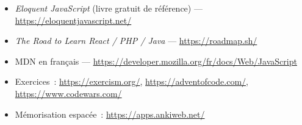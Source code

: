 \begin{ressources}
\begin{itemize}
  \item \emph{Eloquent JavaScript} (livre gratuit de r\'ef\'erence) --- \url{https://eloquentjavascript.net/}
  \item \emph{The Road to Learn React / PHP / Java} --- \url{https://roadmap.sh/}
  \item MDN en fran\c{c}ais --- \url{https://developer.mozilla.org/fr/docs/Web/JavaScript}
  \item Exercices~: \url{https://exercism.org/}, \url{https://adventofcode.com/}, \url{https://www.codewars.com/}
  \item M\'emorisation espac\'ee~: \url{https://apps.ankiweb.net/}
\end{itemize}
\end{ressources}


